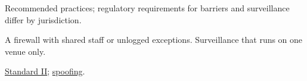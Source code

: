 \begin{qfmethod}
 Recommended practices; regulatory requirements for barriers and surveillance differ by jurisdiction.

 A firewall with shared staff or unlogged exceptions. Surveillance that runs on one venue only.

 \hyperref[rule:standard-market-integrity]{Standard II}; \hyperref[rule:spoofing-securities-markets]{spoofing}.

\end{qfmethod}
